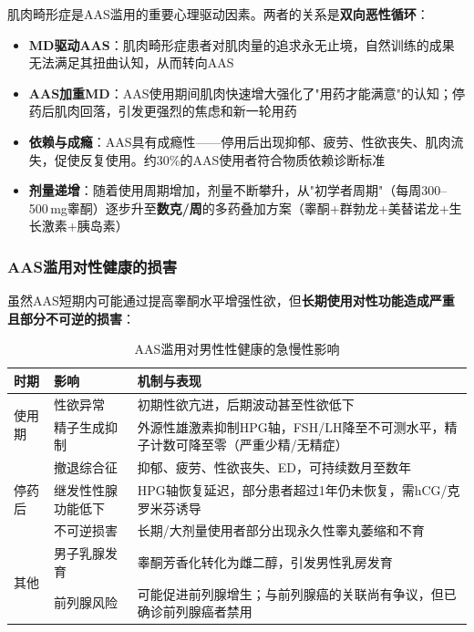 肌肉畸形症是AAS滥用的重要心理驱动因素。两者的关系是\textbf{双向恶性循环}：

\begin{itemize}[leftmargin=2cm]
	\item \textbf{MD驱动AAS}：肌肉畸形症患者对肌肉量的追求永无止境，自然训练的成果无法满足其扭曲认知，从而转向AAS
	\item \textbf{AAS加重MD}：AAS使用期间肌肉快速增大强化了"用药才能满意"的认知；停药后肌肉回落，引发更强烈的焦虑和新一轮用药
	\item \textbf{依赖与成瘾}：AAS具有成瘾性——停用后出现抑郁、疲劳、性欲丧失、肌肉流失，促使反复使用。约30\%的AAS使用者符合物质依赖诊断标准
	\item \textbf{剂量递增}：随着使用周期增加，剂量不断攀升，从"初学者周期"（每周300--500\,mg睾酮）逐步升至\textbf{数克/周}的多药叠加方案（睾酮+群勃龙+美替诺龙+生长激素+胰岛素）
\end{itemize}

\subsubsection{AAS滥用对性健康的损害}

虽然AAS短期内可能通过提高睾酮水平增强性欲，但\textbf{长期使用对性功能造成严重且部分不可逆的损害}：

\begin{table}[htbp]
\centering
\caption{AAS滥用对男性性健康的急慢性影响}
\label{tab:aas_sexual_effects}
\begin{tabularx}{\textwidth}{@{}llX@{}}
    \toprule
    \textbf{时期} & \textbf{影响} & \textbf{机制与表现} \\
    \midrule
    \multirow{2}{*}{使用期} & 性欲异常 & 初期性欲亢进，后期波动甚至性欲低下 \\
     & 精子生成抑制 & 外源性雄激素抑制HPG轴，FSH/LH降至不可测水平，精子计数可降至零（严重少精/无精症） \\
    \midrule
    \multirow{3}{*}{停药后} & 撤退综合征 & 抑郁、疲劳、性欲丧失、ED，可持续数月至数年 \\
     & 继发性性腺功能低下 & HPG轴恢复延迟，部分患者超过1年仍未恢复，需hCG/克罗米芬诱导 \\
     & 不可逆损害 & 长期/大剂量使用者部分出现永久性睾丸萎缩和不育 \\
    \midrule
    \multirow{2}{*}{其他} & 男子乳腺发育 & 睾酮芳香化转化为雌二醇，引发男性乳房发育 \\
     & 前列腺风险 & 可能促进前列腺增生；与前列腺癌的关联尚有争议，但已确诊前列腺癌者禁用 \\
    \bottomrule
\end{tabularx}
\end{table}

